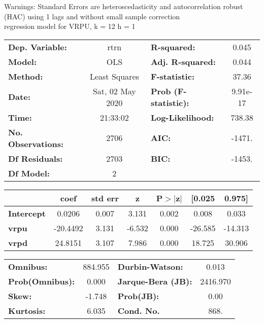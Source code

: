 Warnings: \newline
 [1] Standard Errors are heteroscedasticity and autocorrelation robust (HAC) using 1 lags and without small sample correction\\ 

regression model for VRPU, k = 12 h = 1\begin{center}
\begin{tabular}{lclc}
\toprule
\textbf{Dep. Variable:}    &       rtrn       & \textbf{  R-squared:         } &     0.045   \\
\textbf{Model:}            &       OLS        & \textbf{  Adj. R-squared:    } &     0.044   \\
\textbf{Method:}           &  Least Squares   & \textbf{  F-statistic:       } &     37.36   \\
\textbf{Date:}             & Sat, 02 May 2020 & \textbf{  Prob (F-statistic):} &  9.91e-17   \\
\textbf{Time:}             &     21:33:02     & \textbf{  Log-Likelihood:    } &    738.38   \\
\textbf{No. Observations:} &        2706      & \textbf{  AIC:               } &    -1471.   \\
\textbf{Df Residuals:}     &        2703      & \textbf{  BIC:               } &    -1453.   \\
\textbf{Df Model:}         &           2      & \textbf{                     } &             \\
\bottomrule
\end{tabular}
\begin{tabular}{lcccccc}
                   & \textbf{coef} & \textbf{std err} & \textbf{z} & \textbf{P$> |$z$|$} & \textbf{[0.025} & \textbf{0.975]}  \\
\midrule
\textbf{Intercept} &       0.0206  &        0.007     &     3.131  &         0.002        &        0.008    &        0.033     \\
\textbf{vrpu}      &     -20.4492  &        3.131     &    -6.532  &         0.000        &      -26.585    &      -14.313     \\
\textbf{vrpd}      &      24.8151  &        3.107     &     7.986  &         0.000        &       18.725    &       30.906     \\
\bottomrule
\end{tabular}
\begin{tabular}{lclc}
\textbf{Omnibus:}       & 884.955 & \textbf{  Durbin-Watson:     } &    0.013  \\
\textbf{Prob(Omnibus):} &   0.000 & \textbf{  Jarque-Bera (JB):  } & 2416.970  \\
\textbf{Skew:}          &  -1.748 & \textbf{  Prob(JB):          } &     0.00  \\
\textbf{Kurtosis:}      &   6.035 & \textbf{  Cond. No.          } &     868.  \\
\bottomrule
\end{tabular}
\end{center}

